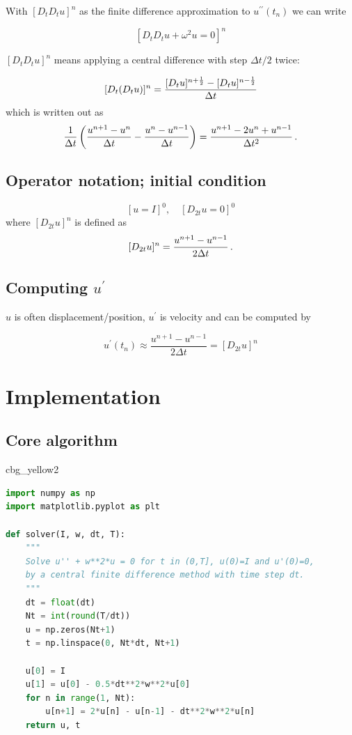 \documentclass[%
oneside,                 %
final,                   %
10pt]{article}
\newenvironment{_cod_tight}[1]{
   \def\FrameCommand{\colorbox{#1}}
   \FrameRule0.6pt\MakeFramed {\FrameRestore}\vskip3mm}
   {\vskip0mm\endMakeFramed}
\newenvironment{cod}[1]{
\bgroup\rmfamily
\fboxsep=0mm\relax
\begin{_cod_tight}{#1}
\list{}{\parsep=-2mm\parskip=0mm\topsep=0pt\leftmargin=2mm
\rightmargin=2\leftmargin\leftmargin=4pt\relax}
\item\relax}
{\endlist\end{_cod_tight}\egroup}
\begin{document}
With $[D_tD_t u]^n$ as the finite difference approximation to
$u^{\prime\prime}(t_n)$ we can write

\[
[D_tD_t u  + \omega^2 u = 0]^n
\]

$[D_tD_t u]^n$ means applying a central difference with step $\Delta t/2$ twice:

\[ [D_t(D_t u)]^n = \frac{[D_t u]^{n+\half} - [D_t u]^{n-\half}}{\Delta t}\]
which is written out as
\[
\frac{1}{\Delta t}\left(\frac{u^{n+1}-u^n}{\Delta t} - \frac{u^{n}-u^{n-1}}{\Delta t}\right) = \frac{u^{n+1}-2u^n + u^{n-1}}{\Delta t^2}
\tp
\]

\subsection*{Operator notation; initial condition}

\[
[u = I]^0,\quad [D_{2t} u = 0]^0
\]
where $[D_{2t} u]^n$ is defined as
\[
[D_{2t} u]^n = \frac{u^{n+1} - u^{n-1}}{2\Delta t}
\tp
\]

\subsection*{Computing $u^{\prime}$}

$u$ is often displacement/position, $u^{\prime}$ is velocity and can be computed by

\[
u^{\prime}(t_n) \approx \frac{u^{n+1}-u^{n-1}}{2\Delta t} = [D_{2t}u]^n
\]


\section*{Implementation}

\subsection*{Core algorithm}

\begin{cod}{cbg_yellow2}\begin{lstlisting}[language=Python,style=simple,xleftmargin=2mm]
import numpy as np
import matplotlib.pyplot as plt

def solver(I, w, dt, T):
    """
    Solve u'' + w**2*u = 0 for t in (0,T], u(0)=I and u'(0)=0,
    by a central finite difference method with time step dt.
    """
    dt = float(dt)
    Nt = int(round(T/dt))
    u = np.zeros(Nt+1)
    t = np.linspace(0, Nt*dt, Nt+1)

    u[0] = I
    u[1] = u[0] - 0.5*dt**2*w**2*u[0]
    for n in range(1, Nt):
        u[n+1] = 2*u[n] - u[n-1] - dt**2*w**2*u[n]
    return u, t
\end{lstlisting}\end{cod}
\noindent
\end{document}
